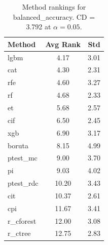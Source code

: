\begin{table}[h]
\centering
\caption{Method rankings for balanced_accuracy. CD = 3.792 at $\alpha=0.05$.}
\label{tab:ranks_balanced_accuracy}
\begin{tabular}{lcc}
\toprule
Method & Avg Rank & Std \\
\midrule
lgbm & 4.17 & 3.01 \\
cat & 4.30 & 2.31 \\
rfe & 4.60 & 3.27 \\
rf & 4.68 & 2.33 \\
et & 5.68 & 2.57 \\
cif & 6.50 & 2.45 \\
xgb & 6.90 & 3.17 \\
boruta & 8.15 & 4.99 \\
ptest_mc & 9.00 & 3.70 \\
pi & 9.03 & 4.02 \\
ptest_rdc & 10.20 & 3.43 \\
cit & 10.37 & 2.61 \\
cpi & 11.67 & 3.41 \\
r_cforest & 12.00 & 3.08 \\
r_ctree & 12.75 & 2.83 \\
\bottomrule
\end{tabular}
\end{table}